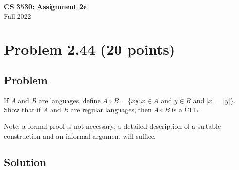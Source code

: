\documentclass{article}
\begin{document}
\begin{center}
\textbf{\Large CS 3530: Assignment 2e} \\[2mm]
Fall 2022
\end{center}

\raggedright








\section*{Problem 2.44 (20 points)}

\subsection*{Problem}

If $A$ and $B$ are languages, define $A\diamond B=\{xy:x\in A$ and
$y\in B$ and $|x|=|y|\}$. Show that if $A$ and $B$ are regular
languages, then $A\diamond B$ is a CFL.

Note: a formal proof is not necessary; a detailed description of a
suitable construction and an informal argument will suffice.

\subsection*{Solution}
\end{document}
